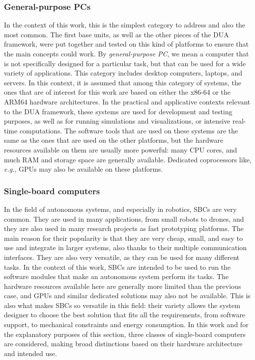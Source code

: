 \subsubsection{General-purpose PCs}
\label{sec:dua_supported_platforms_pc}
In the context of this work, this is the simplest category to address and also the most common. The first base units, as well as the other pieces of the DUA framework, were put together and tested on this kind of platforms to ensure that the main concepts could work. By \emph{general-purpose PC}, we mean a computer that is not specifically designed for a particular task, but that can be used for a wide variety of applications. This category includes desktop computers, laptops, and servers. In this context, it is assumed that among this category of systems, the ones that are of interest for this work are based on either the x86-64 or the ARM64 hardware architectures. In the practical and applicative contexts relevant to the DUA framework, these systems are used for development and testing purposes, as well as for running simulations and visualizations, or intensive real-time computations. The software tools that are used on these systems are the same as the ones that are used on the other platforms, but the hardware resources available on them are usually more powerful: many CPU cores, and much RAM and storage space are generally available. Dedicated coprocessors like, \emph{e.g.}, GPUs may also be available on these platforms.

\subsubsection{Single-board computers}
\label{sec:dua_supported_platforms_sbc}
In the field of autonomous systems, and especially in robotics, SBCs are very common. They are used in many applications, from small robots to drones, and they are also used in many research projects as fast prototyping platforms. The main reason for their popularity is that they are very cheap, small, and easy to use and integrate in larger systems, also thanks to their multiple communication interfaces. They are also very versatile, as they can be used for many different tasks. In the context of this work, SBCs are intended to be used to run the software modules that make an autonomous system perform its tasks. The hardware resources available here are generally more limited than the previous case, and GPUs and similar dedicated solutions may also not be available. This is also what makes SBCs so versatile in this field: their variety allows the system designer to choose the best solution that fits all the requirements, from software support, to mechanical constraints and energy consumption. In this work and for the explanatory purposes of this section, three classes of single-board computers are considered, making broad distinctions based on their hardware architecture and intended use.

